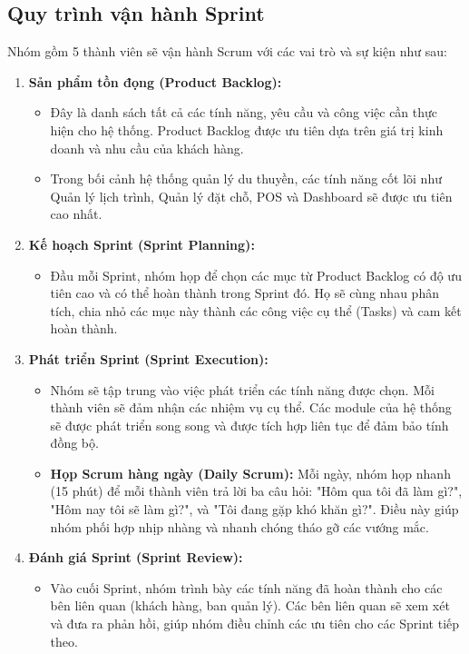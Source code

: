 \documentclass[a4paper,12pt]{article}
\begin{document}
	\subsection*{Quy trình vận hành Sprint}
	
	Nhóm gồm 5 thành viên sẽ vận hành Scrum với các vai trò và sự kiện như sau:
	
	\begin{enumerate}
		\item \textbf{Sản phẩm tồn đọng (Product Backlog):}
		\begin{itemize}
			\item Đây là danh sách tất cả các tính năng, yêu cầu và công việc cần thực hiện cho hệ thống. Product Backlog được ưu tiên dựa trên giá trị kinh doanh và nhu cầu của khách hàng.
			\item Trong bối cảnh hệ thống quản lý du thuyền, các tính năng cốt lõi như Quản lý lịch trình, Quản lý đặt chỗ, POS và Dashboard sẽ được ưu tiên cao nhất.
		\end{itemize}
		
		\item \textbf{Kế hoạch Sprint (Sprint Planning):}
		\begin{itemize}
			\item Đầu mỗi Sprint, nhóm họp để chọn các mục từ Product Backlog có độ ưu tiên cao và có thể hoàn thành trong Sprint đó. Họ sẽ cùng nhau phân tích, chia nhỏ các mục này thành các công việc cụ thể (Tasks) và cam kết hoàn thành.
		\end{itemize}
		
		\item \textbf{Phát triển Sprint (Sprint Execution):}
		\begin{itemize}
			\item Nhóm sẽ tập trung vào việc phát triển các tính năng được chọn. Mỗi thành viên sẽ đảm nhận các nhiệm vụ cụ thể. Các module của hệ thống sẽ được phát triển song song và được tích hợp liên tục để đảm bảo tính đồng bộ.
			\item \textbf{Họp Scrum hàng ngày (Daily Scrum):} Mỗi ngày, nhóm họp nhanh (15 phút) để mỗi thành viên trả lời ba câu hỏi: "Hôm qua tôi đã làm gì?", "Hôm nay tôi sẽ làm gì?", và "Tôi đang gặp khó khăn gì?". Điều này giúp nhóm phối hợp nhịp nhàng và nhanh chóng tháo gỡ các vướng mắc.
		\end{itemize}
		
		\item \textbf{Đánh giá Sprint (Sprint Review):}
		\begin{itemize}
			\item Vào cuối Sprint, nhóm trình bày các tính năng đã hoàn thành cho các bên liên quan (khách hàng, ban quản lý). Các bên liên quan sẽ xem xét và đưa ra phản hồi, giúp nhóm điều chỉnh các ưu tiên cho các Sprint tiếp theo.
		\end{itemize}
		

\end{enumerate}
\end{document}
